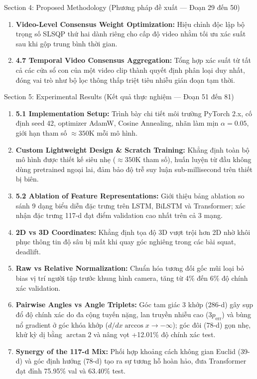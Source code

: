 \documentclass[10pt,a4paper]{article}
\begin{document}
\begin{secbox}{Section 4: Proposed Methodology (Phương pháp đề xuất — Đoạn 29 đến 50)}
\begin{enumerate}[leftmargin=*, itemsep=2pt, topsep=1pt, start=29]
    \item \textbf{Video-Level Consensus Weight Optimization:} Hiệu chỉnh độc lập bộ trọng số SLSQP thứ hai dành riêng cho cấp độ video nhằm tối ưu xác suất sau khi gộp trung bình thời gian.
    \item \textbf{4.7 Temporal Video Consensus Aggregation:} Tổng hợp xác suất từ tất cả các cửa sổ con của một video clip thành quyết định phân loại duy nhất, đóng vai trò như bộ lọc thông thấp triệt tiêu nhiễu gián đoạn tạm thời.
\end{enumerate}
\end{secbox}

\newpage

\begin{secbox}{Section 5: Experimental Results (Kết quả thực nghiệm — Đoạn 51 đến 81)}
\begin{enumerate}[leftmargin=*, itemsep=2pt, topsep=1pt, start=51]
    \item \textbf{5.1 Implementation Setup:} Trình bày chi tiết môi trường PyTorch 2.x, cố định seed 42, optimizer AdamW, Cosine Annealing, nhãn làm mịn $\alpha=0.05$, giới hạn tham số $\approx 350\text{K}$ mỗi mô hình.
    \item \textbf{Custom Lightweight Design \& Scratch Training:} Khẳng định toàn bộ mô hình được thiết kế siêu nhẹ ($\approx 350\text{K}$ tham số), huấn luyện từ đầu không dùng pretrained ngoại lai, đảm bảo độ trễ suy luận sub-millisecond trên thiết bị biên.
    \item \textbf{5.2 Ablation of Feature Representations:} Giới thiệu bảng ablation so sánh 9 dạng biểu diễn đặc trưng trên LSTM, BiLSTM và Transformer; xác nhận đặc trưng 117-d đạt điểm validation cao nhất trên cả 3 mạng.
    \item \textbf{2D vs 3D Coordinates:} Khẳng định tọa độ 3D vượt trội hơn 2D nhờ khôi phục thông tin độ sâu bị mất khi quay góc nghiêng trong các bài squat, deadlift.
    \item \textbf{Raw vs Relative Normalization:} Chuẩn hóa tương đối gốc mũi loại bỏ bias vị trí người tập trước khung hình camera, tăng từ 4\% đến 6\% độ chính xác validation.
    \item \textbf{Pairwise Angles vs Angle Triplets:} Góc tam giác 3 khớp (286-d) gây sụp đổ độ chính xác do đa cộng tuyến nặng, lan truyền nhiễu cao ($3p_{\text{err}}$) và bùng nổ gradient ở góc khóa khớp ($d/dx \arccos x \to -\infty$); góc đôi (78-d) gọn nhẹ, khử kỳ dị bằng $\arctan2$ và nâng vọt +12.01\% độ chính xác test.
    \item \textbf{Synergy of the 117-d Mix:} Phối hợp khoảng cách không gian Euclid (39-d) và góc định hướng (78-d) tạo ra sự tương hỗ hoàn hảo, đưa Transformer đạt đỉnh 75.95\% val và 63.40\% test.

\end{enumerate}
\end{secbox}
\end{document}
